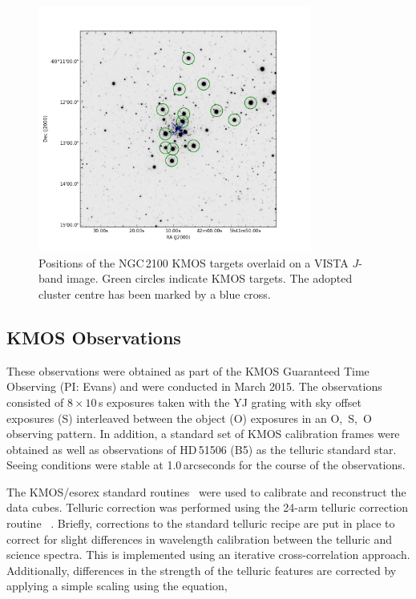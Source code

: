 \documentclass[useAMS,usenatbib]{mn2e}
\begin{document}
\begin{figure}
 \includegraphics[width=9.0cm]{NGC2100-targets}
 \caption{Positions of the NGC\,2100 KMOS targets overlaid on a VISTA $J$-band image.
          Green circles indicate KMOS targets.
          The adopted cluster centre has been marked by a blue cross.\label{fig:targets}
          }
\end{figure}

\subsection{KMOS Observations} %
\label{sub:kmos_observations}

These observations were obtained as part of the KMOS Guaranteed Time Observing (PI: Evans) and were conducted in March 2015.
The observations consisted of $8\times10$\,s exposures taken with the YJ grating with sky offset exposures (S) interleaved between the object (O) exposures in an O,~S,~O observing pattern.
In addition, a standard set of KMOS calibration frames were obtained as well as observations of HD\,51506 (B5) as the telluric standard star.
Seeing conditions were stable at 1.0\,arcseconds for the course of the observations.

The KMOS/esorex standard routines~\citep[SPARK;][]{2013A&A...558A..56D} were used to calibrate and reconstruct the data cubes.
Telluric correction was performed using the 24-arm telluric correction routine
~\citep[described in detail by][]{2015ApJ...803...14P}.
Briefly, corrections to the standard telluric recipe are put in place to correct for slight differences in wavelength calibration between the telluric and science spectra.
This is implemented using an iterative cross-correlation approach.
Additionally, differences in the strength of the telluric features are corrected by applying a simple scaling using the equation,
\end{document}
